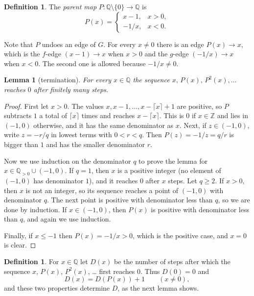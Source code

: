 \documentclass[11pt]{article}
\newtheorem{lemma}[theorem]{Lemma}
\theoremstyle{definition}
\newtheorem{definition}[theorem]{Definition}
\theoremstyle{remark}
\newcommand{\Q}{\mathbb{Q}}
\newcommand{\Z}{\mathbb{Z}}
\newcommand{\Qpos}{\Q_{>0}}
\begin{document}
\begin{definition}\label{def:parent}
The \emph{parent map} $P:\Q\setminus\{0\}\to\Q$ is
\[
P(x)=
\begin{cases}
x-1, & x>0,\\[2pt]
-1/x, & x<0 .
\end{cases}
\]
\end{definition}

Note that $P$ undoes an edge of $G$. For every $x\neq0$ there is an edge $P(x)\to x$, which is the
$f$-edge $(x-1)\to x$ when $x>0$ and the $g$-edge $(-1/x)\to x$ when $x<0$. The second one is allowed
because $-1/x\neq0$.

\begin{lemma}[termination]\label{lem:term}
For every $x\in\Q$ the sequence $x,\,P(x),\,P^2(x),\dots$ reaches $0$ after finitely many steps.
\end{lemma}

\begin{proof}
First let $x>0$. The values $x,x-1,\dots,x-\lceil x\rceil+1$ are positive, so $P$ subtracts $1$ a
total of $\lceil x\rceil$ times and reaches $x-\lceil x\rceil$. This is $0$ if $x\in\Z$ and lies in
$(-1,0)$ otherwise, and it has the same denominator as $x$. Next, if $z\in(-1,0)$, write $z=-r/q$
in lowest terms with $0<r<q$. Then $P(z)=-1/z=q/r$ is bigger than $1$ and has the smaller
denominator $r$.

Now we use induction on the denominator $q$ to prove the lemma for $x\in\Qpos\cup(-1,0)$. If $q=1$,
then $x$ is a positive integer (no element of $(-1,0)$ has denominator $1$), and it reaches $0$
after $x$ steps. Let $q\ge2$. If $x>0$, then $x$ is not an integer, so its sequence reaches a point
of $(-1,0)$ with denominator $q$. The next point is positive with denominator less than $q$, so we
are done by induction. If $x\in(-1,0)$, then $P(x)$ is positive with denominator less than $q$, and
again we use induction.

Finally, if $x\le-1$ then $P(x)=-1/x>0$, which is the positive case, and $x=0$ is clear.
\end{proof}

\begin{definition}\label{def:D}
For $x\in\Q$ let $D(x)$ be the number of steps after which the sequence $x$, $P(x)$,
$P^2(x)$, \dots{} first reaches $0$. Thus $D(0)=0$ and
\begin{equation}\label{eq:Drec}
D(x)=D(P(x))+1 \qquad (x\neq0),
\end{equation}
and these two properties determine $D$, as the next lemma shows.
\end{definition}
\end{document}
